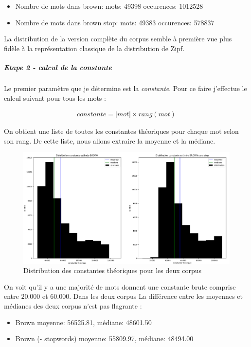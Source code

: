 \documentclass[a4paper,12pt]{article}
\begin{document}
    		\begin{itemize}
    			\item Nombre de mots dans brown:	mots: 49398	occurences: 1012528
    			\item Nombre de mots dans brown stop:	mots: 49383	occurences: 578837\\
    		\end{itemize}
    		
    		La distribution de la version complète du corpus semble à première vue plus fidèle à la représentation classique de la distribution de Zipf. 
			
		\subparagraph{Etape 2 - calcul de la constante}
			Le premier paramètre que je détermine est la \emph{constante}. Pour ce faire j'effectue le calcul suivant pour tous les mots :
			
			\begin{align*}
				constante = |mot| \times rang(mot)
			\end{align*}
			
			On obtient une liste de toutes les constantes théoriques pour chaque mot selon son rang.
			De cette liste, nous allons extraire la moyenne et la médiane.
			
			\begin{figure}[H]
				\includegraphics[width=\linewidth]{img/distribContTh.png}
				\caption{Distribution des constantes théoriques pour les deux corpus}
			\end{figure}
			
			On voit qu'il y a une majorité de mots donnent une constante brute comprise entre $20.000$ et $60.000$. Dans les deux corpus
			La différence entre les moyennes et médianes des deux corpus n'est pas flagrante :
			\begin{itemize}
				\item Brown moyenne: 56525.81, médiane: 48601.50
				\item Brown (- stopwords) moyenne: 55809.97, médiane: 48494.00
			\end{itemize}
\end{document}
